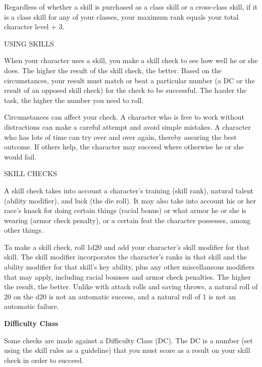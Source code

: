\documentclass{article}
\begin{document}
Regardless of whether a skill is purchased as a class skill or a cross-class skill, 
if it is a class skill for any of your classes, your maximum rank equals your total 
character level + 3.

\vspace{12pt}
{\LARGE{}USING SKILLS}

When your character uses a skill, you make a skill check to see how well he or 
she does. The higher the result of the skill check, the better. Based on the circumstances, 
your result must match or beat a particular number (a DC or the result of an opposed 
skill check) for the check to be successful. The harder the task, the higher the 
number you need to roll.

Circumstances can affect your check. A character who is free to work without distractions 
can make a careful attempt and avoid simple mistakes. A character who has lots 
of time can try over and over again, thereby assuring the best outcome. If others 
help, the character may succeed where otherwise he or she would fail.

\vspace{12pt}
SKILL CHECKS

A skill check takes into account a character's training (skill rank), natural talent 
(ability modifier), and luck (the die roll). It may also take into account his 
or her race's knack for doing certain things (racial bonus) or what armor he or 
she is wearing (armor check penalty), or a certain feat the character possesses, 
among other things. 

To make a skill check, roll 1d20 and add your character's skill modifier for that 
skill. The skill modifier incorporates the character's ranks in that skill and 
the ability modifier for that skill's key ability, plus any other miscellaneous 
modifiers that may apply, including racial bonuses and armor check penalties. The 
higher the result, the better. Unlike with attack rolls and saving throws, a natural 
roll of 20 on the d20 is not an automatic success, and a natural roll of 1 is not 
an automatic failure.

\vspace{12pt}
\textbf{Difficulty Class}

Some checks are made against a Difficulty Class (DC). The DC is a number (set using 
the skill rules as a guideline) that you must score as a result on your skill check 
in order to succeed.
\end{document}
